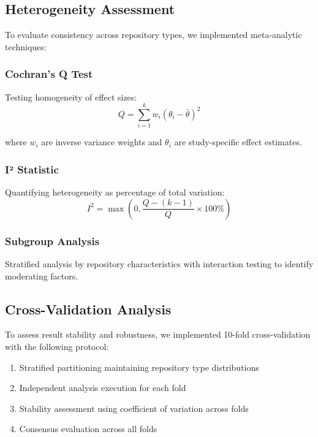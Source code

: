 \documentclass[conference]{IEEEtran}
\begin{document}
\subsection{Heterogeneity Assessment}
\label{subsec:heterogeneity}

To evaluate consistency across repository types, we implemented meta-analytic techniques:

\subsubsection{Cochran's Q Test}
Testing homogeneity of effect sizes:
\begin{equation}
Q = \sum_{i=1}^k w_i(\theta_i - \bar{\theta})^2
\end{equation}

where $w_i$ are inverse variance weights and $\theta_i$ are study-specific effect estimates.

\subsubsection{I² Statistic}
Quantifying heterogeneity as percentage of total variation:
\begin{equation}
I^2 = \max\left(0, \frac{Q - (k-1)}{Q} \times 100\%\right)
\end{equation}

\subsubsection{Subgroup Analysis}
Stratified analysis by repository characteristics with interaction testing to identify moderating factors.

\subsection{Cross-Validation Analysis}
\label{subsec:cross_validation}

To assess result stability and robustness, we implemented 10-fold cross-validation with the following protocol:

\begin{enumerate}
    \item Stratified partitioning maintaining repository type distributions
    \item Independent analysis execution for each fold
    \item Stability assessment using coefficient of variation across folds
    \item Consensus evaluation across all folds
\end{enumerate}
\end{document}
